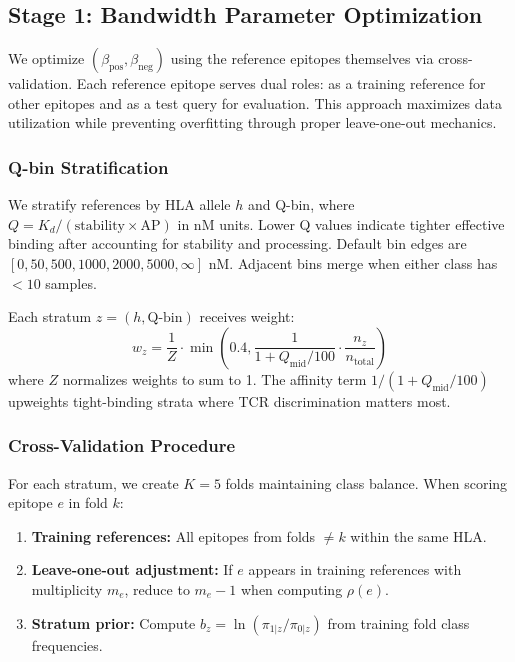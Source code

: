 \documentclass[11pt]{article}
\begin{document}
\subsection{Stage 1: Bandwidth Parameter Optimization}

We optimize $(\beta_{\mathrm{pos}}, \beta_{\mathrm{neg}})$ using the reference epitopes themselves via cross-validation. Each reference epitope serves dual roles: as a training reference for other epitopes and as a test query for evaluation. This approach maximizes data utilization while preventing overfitting through proper leave-one-out mechanics.

\subsubsection{Q-bin Stratification}

We stratify references by HLA allele $h$ and Q-bin, where $Q = K_d/(\text{stability} \times \text{AP})$ in nM units. Lower Q values indicate tighter effective binding after accounting for stability and processing. Default bin edges are $[0, 50, 500, 1000, 2000, 5000, \infty]$ nM. Adjacent bins merge when either class has $<10$ samples.

Each stratum $z = (h, \text{Q-bin})$ receives weight:
\[
w_z = \frac{1}{Z} \cdot \min\left(0.4, \frac{1}{1 + Q_{\text{mid}}/100} \cdot \frac{n_z}{n_{\text{total}}}\right)
\]
where $Z$ normalizes weights to sum to 1. The affinity term $1/(1 + Q_{\text{mid}}/100)$ upweights tight-binding strata where TCR discrimination matters most.

\subsubsection{Cross-Validation Procedure}

For each stratum, we create $K=5$ folds maintaining class balance. When scoring epitope $e$ in fold $k$:
\begin{enumerate}
  \item \textbf{Training references:} All epitopes from folds $\neq k$ within the same HLA.
  \item \textbf{Leave-one-out adjustment:} If $e$ appears in training references with multiplicity $m_e$, reduce to $m_e - 1$ when computing $\rho(e)$.
  \item \textbf{Stratum prior:} Compute $b_z = \ln(\pi_{1|z}/\pi_{0|z})$ from training fold class frequencies.
\end{enumerate}
\end{document}
